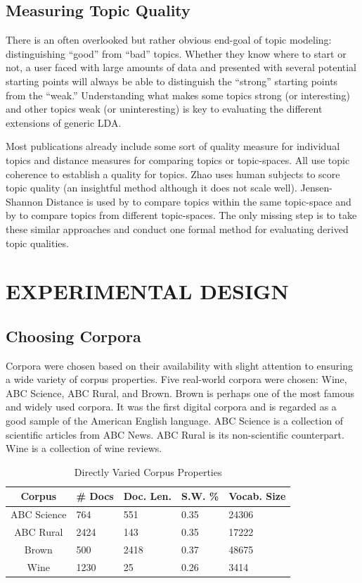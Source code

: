 \documentclass[letterpaper, 10 pt, conference]{ieeeconf}  %
\begin{document}
\subsection{Measuring Topic Quality}

There is an often overlooked but rather obvious end-goal of topic modeling: distinguishing ``good'' from ``bad'' topics. Whether they know where to start or not, a user faced with large amounts of data and presented with several potential starting points will always be able to distinguish the ``strong'' starting points from the ``weak.'' Understanding what makes some topics strong (or interesting) and other topics weak (or uninteresting) is key to evaluating the different extensions of generic LDA.

Most publications already include some sort of quality measure for individual topics and distance measures for comparing topics or topic-spaces. All use topic coherence to establish a quality for topics. Zhao uses human subjects to score topic quality (an insightful method although it does not scale well). Jensen-Shannon Distance is used by \cite{mimno2007organizing,zhao2011comparing,zuo2016topic} to compare topics within the same topic-space and by \cite{tang2014understanding} to compare topics from different topic-spaces. The only missing step is to take these similar approaches and conduct one formal method for evaluating derived topic qualities.

\section{EXPERIMENTAL DESIGN}

\subsection{Choosing Corpora}

Corpora were chosen based on their availability with slight attention to ensuring a wide variety of corpus properties. Five real-world corpora were chosen: Wine, ABC Science, ABC Rural, and Brown. Brown is perhaps one of the most famous and widely used corpora. It was the first digital corpora and is regarded as a good sample of the American English language. ABC Science is a collection of scientific articles from ABC News. ABC Rural is its non-scientific counterpart. Wine is a collection of wine reviews.

\begin{table}[ht]
\renewcommand{\arraystretch}{1.3}
\caption{Directly Varied Corpus Properties}
\label{corpus_properties}
\centering
\begin{tabular}{c||l|l|l|l}
\hline
\bfseries Corpus & \bfseries \# Docs & \bfseries Doc. Len. & \bfseries S.W. \% & \bfseries Vocab. Size \\
\hline\hline
ABC Science & 764 & 551 & 0.35 & 24306\\
ABC Rural & 2424 & 143 & 0.35 & 17222\\
Brown & 500 & 2418 & 0.37 & 48675\\
Wine & 1230 & 25 & 0.26 & 3414\\
\hline
\end{tabular}
\end{table}
\end{document}
